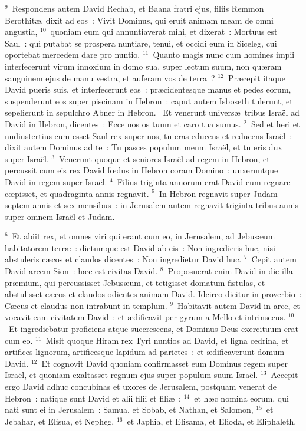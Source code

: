 ${}^{9}$~Respondens autem David Rechab, et Baana fratri ejus, filiis Remmon Berothit\ae , dixit ad eos~: Vivit Dominus, qui eruit animam meam de omni angustia,
${}^{10}$~quoniam eum qui annuntiaverat mihi, et dixerat~: Mortuus est Saul~: qui putabat se prospera nuntiare, tenui, et occidi eum in Siceleg, cui oportebat mercedem dare pro nuntio.
${}^{11}$~Quanto magis nunc cum homines impii interfecerunt virum innoxium in domo sua, super lectum suum, non qu\ae ram sanguinem ejus de manu vestra, et auferam vos de terra~?
${}^{12}$~Pr\ae cepit itaque David pueris suis, et interfecerunt eos~: pr\ae cidentesque manus et pedes eorum, suspenderunt eos super piscinam in Hebron~: caput autem Isboseth tulerunt, et sepelierunt in sepulchro Abner in Hebron.
~Et venerunt univers\ae\ tribus Isra\"el ad David in Hebron, dicentes~: Ecce nos os tuum et caro tua sumus.
${}^{2}$~Sed et heri et nudiustertius cum esset Saul rex super nos, tu eras educens et reducens Isra\"el~: dixit autem Dominus ad te~: Tu pasces populum meum Isra\"el, et tu eris dux super Isra\"el.
${}^{3}$~Venerunt quoque et seniores Isra\"el ad regem in Hebron, et percussit cum eis rex David fœdus in Hebron coram Domino~: unxeruntque David in regem super Isra\"el.
${}^{4}$~Filius triginta annorum erat David cum regnare cœpisset, et quadraginta annis regnavit.
${}^{5}$~In Hebron regnavit super Judam septem annis et sex mensibus~: in Jerusalem autem regnavit triginta tribus annis super omnem Isra\"el et Judam.


${}^{6}$~Et abiit rex, et omnes viri qui erant cum eo, in Jerusalem, ad Jebus\ae um habitatorem terr\ae~: dictumque est David ab eis~: Non ingredieris huc, nisi abstuleris c\ae cos et claudos dicentes~: Non ingredietur David huc.
${}^{7}$~Cepit autem David arcem Sion~: h\ae c est civitas David.
${}^{8}$~Proposuerat enim David in die illa pr\ae mium, qui percussisset Jebus\ae um, et tetigisset domatum fistulas, et abstulisset c\ae cos et claudos odientes animam David. Idcirco dicitur in proverbio~: C\ae cus et claudus non intrabunt in templum.
${}^{9}$~Habitavit autem David in arce, et vocavit eam civitatem David~: et \ae dificavit per gyrum a Mello et intrinsecus.
${}^{10}$~Et ingrediebatur proficiens atque succrescens, et Dominus Deus exercituum erat cum eo.
${}^{11}$~Misit quoque Hiram rex Tyri nuntios ad David, et ligna cedrina, et artifices lignorum, artificesque lapidum ad parietes~: et \ae dificaverunt domum David.
${}^{12}$~Et cognovit David quoniam confirmasset eum Dominus regem super Isra\"el, et quoniam exaltasset regnum ejus super populum suum Isra\"el.
${}^{13}$~Accepit ergo David adhuc concubinas et uxores de Jerusalem, postquam venerat de Hebron~: natique sunt David et alii filii et fili\ae~:
${}^{14}$~et h\ae c nomina eorum, qui nati sunt ei in Jerusalem~: Samua, et Sobab, et Nathan, et Salomon,
${}^{15}$~et Jebahar, et Elisua, et Nepheg,
${}^{16}$~et Japhia, et Elisama, et Elioda, et Eliphaleth.


